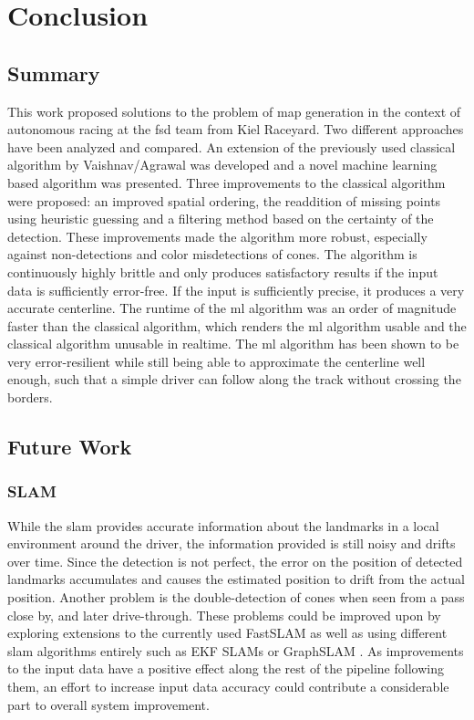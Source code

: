 \chapter{Conclusion}
\label{chap:end}

\section{Summary}
This work proposed solutions to the problem of map generation in the context of autonomous racing at the \ac{fsd} team from Kiel Raceyard. Two different approaches have been analyzed and compared. An extension of the previously used classical algorithm by Vaishnav/Agrawal was developed and a novel machine learning based algorithm was presented. Three improvements to the classical algorithm were proposed: an improved spatial ordering, the readdition of missing points using heuristic guessing and a filtering method based on the certainty of the detection. These improvements made the algorithm more robust, especially against non-detections and color misdetections of cones. The algorithm is continuously highly brittle and only produces satisfactory results if the input data is sufficiently error-free. If the input is sufficiently precise, it produces a very accurate centerline. The runtime of the \ac{ml} algorithm was an order of magnitude faster than the classical algorithm, which renders the \ac{ml} algorithm usable and the classical algorithm unusable in realtime. The \ac{ml} algorithm has been shown to be very error-resilient while still being able to approximate the centerline well enough, such that a simple driver can follow along the track without crossing the borders.

\section{Future Work}
\subsection{SLAM} 
While the \ac{slam} provides accurate information about the landmarks in a local environment around the driver, the information provided is still noisy and drifts over time. Since the detection is not perfect, the error on the position of detected landmarks accumulates and causes the estimated position to drift from the actual position. Another problem is the double-detection of cones when seen from a pass close by, and later drive-through. These problems could be improved upon by exploring extensions to the currently used FastSLAM \cite{FastSLAM2002} as well as using different \ac{slam} algorithms entirely such as EKF SLAMs \cite{EKFSLAM1986} or GraphSLAM \cite{graphSLAM2006}. As improvements to the input data have a positive effect along the rest of the pipeline following them, an effort to increase input data accuracy could contribute a considerable part to overall system improvement.
